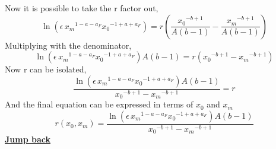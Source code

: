 \documentclass{article}
\numberwithin{equation}{section} %
\begin{document}
Now it is possible to take the r factor out,
\begin{equation}
    \ln  \left( \epsilon\,{x_{m}}^{1-a-a_{F}}{x_{0}}^{-1+a+a_{F}} \right) 
=r \left( {\frac {{x_{0}}^{-b+1}}{A \left( b-1 \right) }}-{\frac {{x_{
m}}^{-b+1}}{A \left( b-1 \right) }} \right) 
\end{equation}
Multiplying with the denominator,
\begin{equation}
    \ln  \left( \epsilon\,{x_{m}}^{1-a-a_{F}}{x_{0}}^{-1+a+a_{F}} \right) 
A \left( b-1 \right) =r \left( {x_{0}}^{-b+1}-{x_{m}}^{-b+1} \right) 
\end{equation}
Now r can be isolated,
\begin{equation}
    {\frac {\ln  \left( \epsilon\,{x_{m}}^{1-a-a_{F}}{x_{0}}^{-1+a+a_{F}}
 \right) A \left( b-1 \right) }{{x_{0}}^{-b+1}-{x_{m}}^{-b+1}}}=r
\end{equation}
And the final equation can be expressed in terms of $x_0$ and $x_m$ 
\begin{equation}\label{eq:appIr}
    r \left( x_{0},x_{m} \right) ={\frac {\ln  \left( \epsilon\,{x_{m}}^{1
-a-a_{F}}{x_{0}}^{-1+a+a_{F}} \right) A \left( b-1 \right) }{{x_{0}}^{
-b+1}-{x_{m}}^{-b+1}}}
\end{equation}
\textbf{\hyperref[jmp:a:derivation_r]{Jump back }}

\newpage
\end{document}
